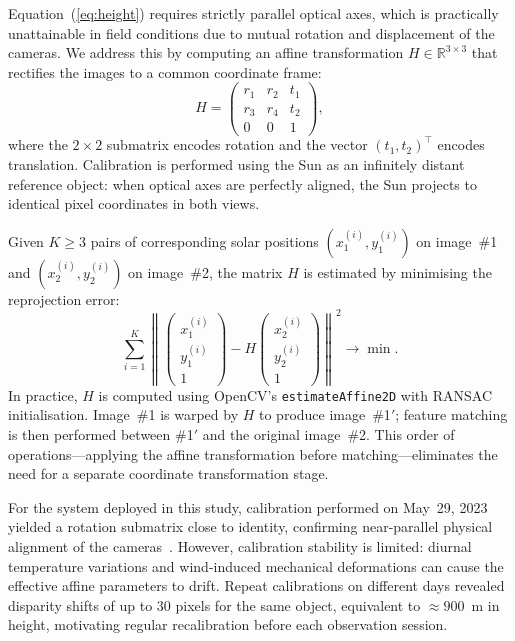 \documentclass[preprint,
superscriptaddress,
amsmath,amssymb,aps,
twoside,final,secnumarabic,
nofootinbib]{revtex4-2}
\begin{document}
Equation~(\ref{eq:height}) requires strictly parallel optical axes, which is practically unattainable in field conditions due to mutual rotation and displacement of the cameras. We address this by computing an affine transformation $H \in \mathbb{R}^{3 \times 3}$ that rectifies the images to a common coordinate frame:
\begin{equation}
H = \begin{pmatrix} r_1 & r_2 & t_1 \\ r_3 & r_4 & t_2 \\ 0 & 0 & 1 \end{pmatrix},
\end{equation}
where the $2 \times 2$ submatrix encodes rotation and the vector $(t_1, t_2)^\top$ encodes translation. Calibration is performed using the Sun as an infinitely distant reference object: when optical axes are perfectly aligned, the Sun projects to identical pixel coordinates in both views.

Given $K \ge 3$ pairs of corresponding solar positions $(x_1^{(i)}, y_1^{(i)})$ on image~\#1 and $(x_2^{(i)}, y_2^{(i)})$ on image~\#2, the matrix $H$ is estimated by minimising the reprojection error:
\begin{equation}
\sum_{i=1}^{K} \left\| \begin{pmatrix} x_1^{(i)} \\ y_1^{(i)} \\ 1 \end{pmatrix} - H \begin{pmatrix} x_2^{(i)} \\ y_2^{(i)} \\ 1 \end{pmatrix} \right\|^2 \to \min.
\end{equation}
In practice, $H$ is computed using OpenCV's \texttt{estimateAffine2D} with RANSAC initialisation. Image~\#1 is warped by $H$ to produce image~\#1$'$; feature matching is then performed between \#1$'$ and the original image~\#2. This order of operations---applying the affine transformation before matching---eliminates the need for a separate coordinate transformation stage.

For the system deployed in this study, calibration performed on May~29, 2023 yielded a rotation submatrix close to identity, confirming near-parallel physical alignment of the cameras~\cite{3,4}. However, calibration stability is limited: diurnal temperature variations and wind-induced mechanical deformations can cause the effective affine parameters to drift. Repeat calibrations on different days revealed disparity shifts of up to 30 pixels for the same object, equivalent to $\approx 900$~m in height, motivating regular recalibration before each observation session.
\end{document}
